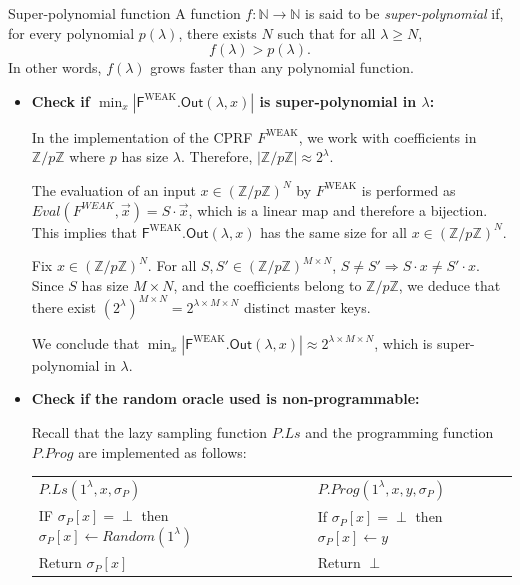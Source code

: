 \documentclass[9pt]{extarticle}
\begin{document}
\begin{defbox}{Super-polynomial function}
A function $f : \mathbb{N} \rightarrow \mathbb{N}$ is said to be \emph{super-polynomial} if, for every polynomial $p(\lambda)$, there exists $N$ such that for all $\lambda \geq N$,
\[
f(\lambda) > p(\lambda).
\]
In other words, $f(\lambda)$ grows faster than any polynomial function.
\end{defbox}

\begin{itemize}
\item \textbf{Check if $\min_x |\textsf{F}^{\text{WEAK}}\textsf{.Out}(\lambda, x)|$ is super-polynomial in $\lambda$:}

In the implementation of the CPRF $F^{\text{WEAK}}$, we work with coefficients in $\mathbb{Z}/p\mathbb{Z}$ where $p$ has size $\lambda$. Therefore, $|\mathbb{Z}/p\mathbb{Z}| \approx 2^{\lambda}$.

The evaluation of an input $x \in (\mathbb{Z}/p\mathbb{Z})^N$ by $F^{\text{WEAK}}$ is performed as $Eval(F^{WEAK},\vec{x}) = S \cdot \vec{x}$, which is a linear map and therefore a bijection. This implies that $\textsf{F}^{\text{WEAK}}\textsf{.Out}(\lambda, x)$ has the same size for all $x \in (\mathbb{Z}/p\mathbb{Z})^N$.

Fix $x \in (\mathbb{Z}/p\mathbb{Z})^N$. For all $S,S' \in (\mathbb{Z}/p\mathbb{Z})^{M \times N}$, $S \neq S' \Rightarrow S \cdot x \neq S' \cdot x$. Since $S$ has size $M \times N$, and the coefficients belong to $\mathbb{Z}/p\mathbb{Z}$, we deduce that there exist $(2^{\lambda})^{M \times N} = 2^{\lambda \times M \times N}$ distinct master keys.

We conclude that $\min_x |\textsf{F}^{\text{WEAK}}\textsf{.Out}(\lambda, x)| \approx 2^{\lambda \times M \times N}$, which is super-polynomial in $\lambda$.

\item \textbf{Check if the random oracle used is non-programmable:}

Recall that the lazy sampling function $P.Ls$ and the programming function $P.Prog$ are implemented as follows:

\begin{center}
  \begin{tabular}{l|l}
    \textbf{\underline{$P.Ls(1^{\lambda}, x, \sigma_P)$}} & \textbf{\underline{$P.Prog(1^{\lambda}, x, y, \sigma_P)$}} \\
    IF $\sigma_P[x] = \perp$ then $\sigma_P[x] \leftarrow Random(1^{\lambda})$ & If $\sigma_P[x] = \perp$ then $\sigma_P[x] \leftarrow y$ \\
    Return $\sigma_P[x]$ & Return $\perp$
  \end{tabular}
\end{center}


\end{itemize}
\end{document}

